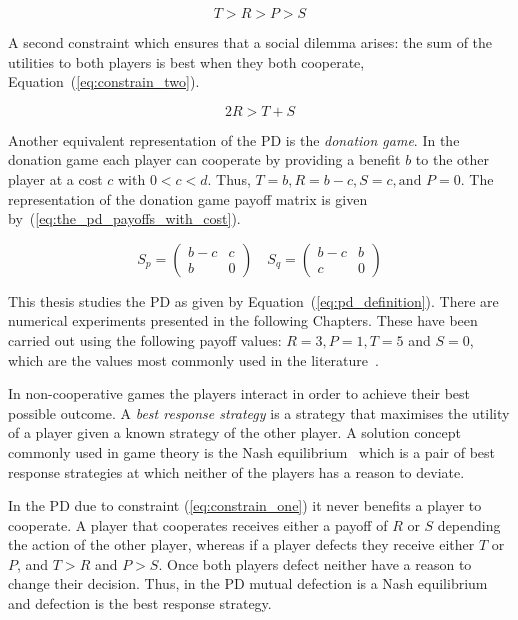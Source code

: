 \begin{equation}\label{eq:constrain_one}
    T > R > P > S
\end{equation}

A second constraint which ensures that a social dilemma arises: the sum
of the utilities to both players is best when they both cooperate,
Equation~(\ref{eq:constrain_two}).

\begin{equation}\label{eq:constrain_two}
    2R > T + S
\end{equation}

Another equivalent representation of the PD is the \textit{donation game}.
In the donation game each player can cooperate by providing a benefit \(b\) to
the other player at a cost \(c\) with \(0 < c < d\). Thus, \(T=b, R=b-c,S=c,
\text{and } P=0\). The representation of the donation game payoff matrix is
given by~(\ref{eq:the_pd_payoffs_with_cost}).

\begin{equation}\label{eq:the_pd_payoffs_with_cost}
    S_p =
    \begin{pmatrix}
        b - c & c\\
        b & 0
    \end{pmatrix}
    \quad
    S_q =
    \begin{pmatrix}
        b - c & b  \\
        c & 0
    \end{pmatrix}
\end{equation}

This thesis studies the PD as given by Equation~(\ref{eq:pd_definition}). There
are numerical experiments presented in the following Chapters. These have been
carried out using the following payoff values: \(R = 3, P = 1, T = 5\) and \(S =
0\), which are the values most commonly used in the
literature~\cite{Axelrod1984, Knight2017}.  %

In non-cooperative games the players interact in order to achieve their best 
possible outcome. A \textit{best response strategy} is a strategy
that maximises the utility of a player given a known strategy of the other
player. A solution concept commonly used in game theory is the Nash equilibrium~\cite{Nash1951}
which is a pair of best response strategies at which neither of the players has
a reason to deviate.

In the PD due to constraint (\ref{eq:constrain_one}) it never benefits a player
to cooperate. A player that cooperates receives either a payoff of \(R\) or \(S\)
depending the action of the other player, whereas if a player defects they
receive either \(T\) or \(P\), and \(T > R\) and \(P > S\). Once both
players defect neither have a reason to change their decision. Thus, in the
PD mutual defection is a Nash equilibrium and defection is the
best response strategy.

